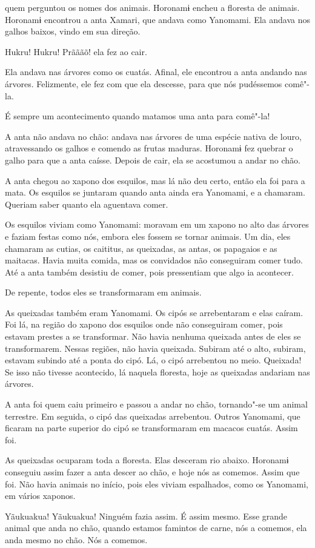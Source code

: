  

 

 quem perguntou os nomes dos animais. Horonamɨ encheu a
floresta de animais. 
Horonamɨ encontrou a anta Xamari, que andava como Yanomami. Ela andava
nos galhos baixos, vindo em sua direção. 

Hukru! Hukru! Prãããõ! ela fez ao cair. 

Ela andava nas árvores como os cuatás. Afinal, ele encontrou a anta
andando nas árvores. Felizmente, ele fez com que ela descesse, para que
nós pudéssemos comê"-la. 

É sempre um acontecimento quando matamos uma anta para comê"-la! 

A anta não andava no chão: andava nas árvores de uma espécie nativa de
louro, atravessando os galhos e comendo as frutas maduras. Horonamɨ fez
quebrar o galho para que a anta caísse. Depois de cair, ela se acostumou
a andar no chão. 

A anta chegou ao xapono dos esquilos, mas lá não deu certo, então ela
foi para a mata. Os esquilos se juntaram quando anta ainda era Yanomami,
e a chamaram. Queriam saber quanto ela aguentava comer.

Os esquilos viviam como Yanomami: moravam em um xapono no alto das
árvores e faziam festas como nós, embora eles fossem se tornar animais.
Um dia, eles chamaram as cutias, os caititus, as queixadas, as antas, os
papagaios e as maitacas. Havia muita comida, mas os convidados não
conseguiram comer tudo. Até a anta também desistiu de comer, pois
pressentiam que algo ia acontecer. 

De repente, todos eles se transformaram em animais. 

As queixadas também eram Yanomami. Os cipós se
arrebentaram e elas caíram. Foi lá, na região do xapono dos esquilos
onde não conseguiram comer, pois estavam prestes a se transformar. Não
havia nenhuma queixada antes de eles se transformarem. Nessas regiões,
não havia queixada. Subiram até o alto, subiram, estavam subindo até a
ponta do cipó. Lá, o cipó arrebentou no meio. Queixada! Se isso não
tivesse acontecido, lá naquela floresta, hoje as queixadas andariam nas
árvores. 

A anta foi quem caiu primeiro e passou a andar no chão, tornando"-se um
animal terrestre. Em seguida, o cipó das queixadas arrebentou. Outros
Yanomami, que ficaram na parte superior do cipó se transformaram em
macacos cuatás. Assim foi. 

As queixadas ocuparam toda a floresta. Elas desceram rio abaixo.
Horonamɨ conseguiu assim fazer a anta descer ao chão, e hoje nós as
comemos. Assim que foi. Não havia animais no início, pois eles viviam
espalhados, como os Yanomami, em vários xaponos. 

Yãukuakua! Yãukuakua! Ninguém fazia assim. É assim mesmo. Esse
grande animal que anda no chão, quando estamos famintos de carne, nós a
comemos, ela anda mesmo no chão. Nós a comemos. 

 
